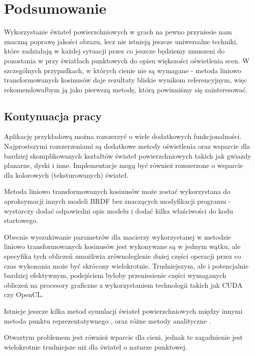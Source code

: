 \documentclass[../main.tex]{subfiles}
\begin{document}
\chapter{Podsumowanie}

Wykorzystanie świateł powierzchniowych w grach na pewno przyniesie nam znaczną poprawę jakości obrazu, lecz nie istnieją jeszcze uniwersalne techniki, które zadziałają w każdej sytuacji przez co jeszcze będziemy zmuszeni do pozostania w przy światłach punktowych do opisu większości oświetlenia scen. W szczególnych przypadkach, w których cienie nie są wymagane - metoda liniowo transformowanych kosinusów daje rezultaty bliskie wynikom referencyjnym, więc rekomendowałbym ją jako pierwszą metodę, którą powinniśmy się zainteresować.

\section{Kontynuacja pracy}

Aplikację przykładową można rozszerzyć o wiele dodatkowych funkcjonalności. Najprostszymi rozszerzeniami są dodatkowe metody oświetlenia oraz wsparcie dla bardziej skomplikowanych kształtów świateł powierzchniowych takich jak gwiazdy planarne, dyski i inne. Implementacje mogą być również rozszerzone o wsparcie dla kolorowych (teksturowanych) świateł.

Metoda liniowo transformowanych kosinusów może zostać wykorzystana do aproksymacji innych modeli BRDF bez znaczących modyfikacji programu - wystarczy dodać odpowiedni opis modelu i dodać kilka właściwości do kodu startowego.

Obecnie wyszukiwanie parametrów dla macierzy wykorzystanej w metodzie liniowo transformowanych kosinusów jest wykonywane są w jednym wątku, ale specyfika tych obliczeń umożliwia zrównoleglenie dużej części operacji przez co czas wykonania może być skrócony wielokrotnie. Trudniejszym, ale i potencjalnie bardziej efektywnym, podejściem byłoby przeniesienie części wymaganych obliczeń na procesory graficzne z wykorzystaniem technologii takich jak CUDA czy OpenCL.

Istnieje jeszcze kilka metod symulacji świateł powierzchniowych między innymi
metoda punktu reprezentatywnego
\cite{pbr_ue4},
\cite{Drobot}
oraz
różne metody analityczne
\cite{Snyder}
\cite{LecoqAnalyticApproximationsForALS}
.

Otwartym problemem jest również wparcie dla cieni, jednak te zagadnienie jest wielokrotnie trudniejsze niż dla świateł o naturze punktowej.
\end{document}
